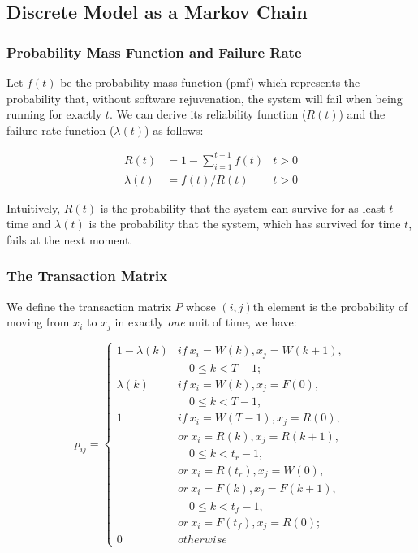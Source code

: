 \subsection{Discrete Model as a Markov Chain}
\label{discrete_model}

\subsubsection{Probability Mass Function and Failure Rate}

Let $f(t)$ be the probability mass function (pmf) which represents the 
probability that, without software rejuvenation, the system will fail when 
being running for exactly $t$.  We can derive its reliability function ($R(t)$) 
and the failure rate function ($\lambda(t)$) as follows:

\begin{subequations}
\begin{align}
R(t) & = 1- \sum \limits_{i=1}^{t-1} f(t) & t > 0 \label{discrete_reliability}\\
\lambda(t) & = f(t)/R(t)  & t>0 \label{discrete_failure_rate}
\end{align}
\end{subequations}

Intuitively, $R(t)$ is the probability that the system can survive for as least 
$t$ time and $\lambda(t)$ is the probability that the system, which has 
survived for time $t$, fails at the next moment.

\subsubsection{The Transaction Matrix}

We define the transaction matrix $P$ whose $(i,j)$th element is the probability 
of moving from $x_i$ to $x_j$ in exactly {\it one} unit of time,  we have:

\begin{equation*}
p_{ij} = 
\begin{cases} 
1 - \lambda(k) & if\ x_i = W(k), x_j = W(k+1),\\ &\hspace{12pt}  0\leq k <T-1; 
\\
\lambda(k)     & if\ x_i = W(k), x_j = F(0),\\ &\hspace{12pt}  0\leq k <T-1,  \\
1              & if\ x_i = W(T-1), x_j = R(0), \\
               & or\ x_i = R(k), x_j = R(k+1),\\ &\hspace{12pt}  0\leq k < 
t_r-1, \\
               & or\ x_i = R(t_r), x_j = W(0), \\
               & or\ x_i = F(k), x_j = F(k+1),\\ &\hspace{12pt}  0\leq k <t_f-1, 
\\
               & or\ x_i = F(t_f), x_j = R(0); \\
0              & otherwise
\end{cases}
\end{equation*}

